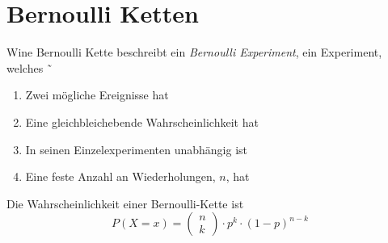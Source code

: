 \documentclass{article}
\begin{document}
\section{Bernoulli Ketten}
Wine Bernoulli Kette beschreibt ein \emph{Bernoulli Experiment}, ein Experiment, welches
˜\begin{enumerate}
 \item Zwei mögliche Ereignisse hat
 \item Eine gleichbleichebende Wahrscheinlichkeit hat
 \item In seinen Einzelexperimenten unabhängig ist
 \item Eine feste Anzahl an Wiederholungen, $n$, hat 
\end{enumerate} 
Die Wahrscheinlichkeit einer Bernoulli-Kette ist
\[
 P(X=x) =
 \begin{pmatrix} n \\ k \end{pmatrix} \cdot
  p^k \cdot (1-p)^{n-k}
\] 
\end{document}
